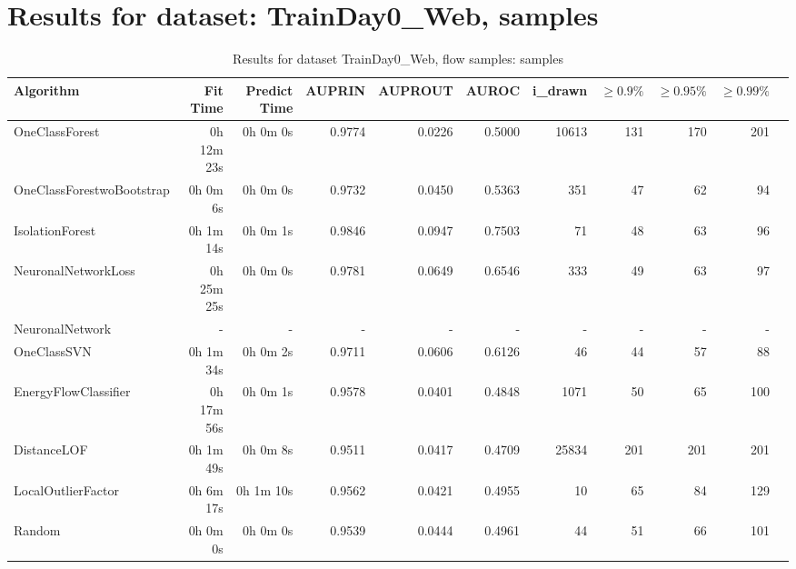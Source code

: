 \documentclass{article}
\begin{document}
\section*{Results for dataset: TrainDay0_Web, samples}
\begin{table}[h!]
\centering
\caption{Results for dataset TrainDay0_Web, flow samples: samples}
\begin{tabular}{lrrrrrrrrrr}
\toprule
Algorithm & Fit Time & Predict Time & AUPRIN & AUPROUT & AUROC & i\_drawn & $\geq 0.9\%$ & $\geq 0.95\%$ & $\geq 0.99\%$ \\
\midrule
OneClassForest & 0h 12m 23s & 0h 0m 0s & 0.9774 & 0.0226 & 0.5000 & 10613 & 131 & 170 & 201 \\
OneClassForestwoBootstrap & 0h 0m 6s & 0h 0m 0s & 0.9732 & 0.0450 & 0.5363 & 351 & 47 & 62 & 94 \\
IsolationForest & 0h 1m 14s & 0h 0m 1s & 0.9846 & 0.0947 & 0.7503 & 71 & 48 & 63 & 96 \\
NeuronalNetworkLoss & 0h 25m 25s & 0h 0m 0s & 0.9781 & 0.0649 & 0.6546 & 333 & 49 & 63 & 97 \\
NeuronalNetwork & - & - & - & - & - & - & - & - & - \\
OneClassSVN & 0h 1m 34s & 0h 0m 2s & 0.9711 & 0.0606 & 0.6126 & 46 & 44 & 57 & 88 \\
EnergyFlowClassifier & 0h 17m 56s & 0h 0m 1s & 0.9578 & 0.0401 & 0.4848 & 1071 & 50 & 65 & 100 \\
DistanceLOF & 0h 1m 49s & 0h 0m 8s & 0.9511 & 0.0417 & 0.4709 & 25834 & 201 & 201 & 201 \\
LocalOutlierFactor & 0h 6m 17s & 0h 1m 10s & 0.9562 & 0.0421 & 0.4955 & 10 & 65 & 84 & 129 \\
Random & 0h 0m 0s & 0h 0m 0s & 0.9539 & 0.0444 & 0.4961 & 44 & 51 & 66 & 101 \\
\bottomrule
\end{tabular}
\end{table}
\end{document}
